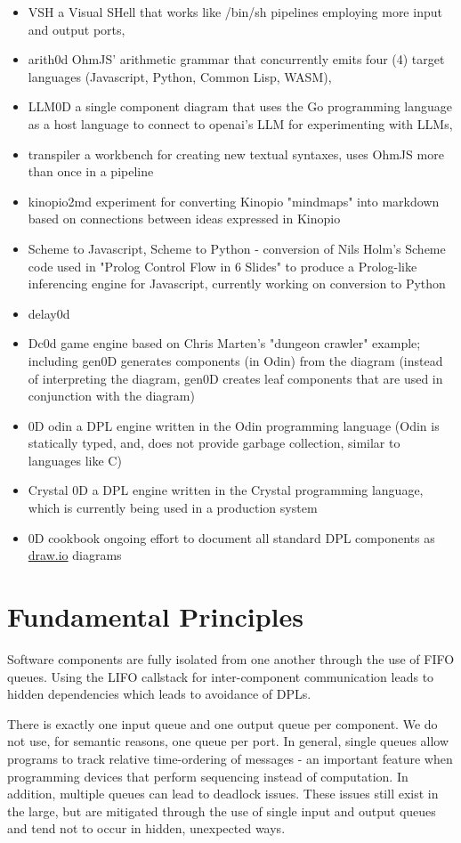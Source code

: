 \documentclass[10pt]{acmart}
\begin{document}
\begin{itemize}
\item VSH a Visual SHell that works like /bin/sh pipelines employing more input and output ports,
\item arith0d OhmJS' arithmetic grammar that concurrently emits four (4) target languages (Javascript, Python, Common Lisp, WASM),
\item LLM0D a single component diagram that uses the Go programming language as a host language to connect to openai's LLM for experimenting with LLMs,
\item transpiler a workbench for creating new textual syntaxes, uses OhmJS more than once in a pipeline
\item kinopio2md experiment for converting Kinopio "mindmaps" into markdown based on connections between ideas expressed in Kinopio
\item Scheme to Javascript, Scheme to Python - conversion of Nils Holm's Scheme code used in "Prolog Control Flow in 6 Slides" to produce a Prolog-like inferencing engine for Javascript, currently working on conversion to Python
\item delay0d
\item Dc0d game engine based on Chris Marten's "dungeon crawler" example\cite{ceptre_paper}; including gen0D generates components (in Odin) from the diagram (instead of interpreting the diagram, gen0D creates leaf components that are used in conjunction with the diagram)
\item 0D odin a DPL engine written in the Odin programming language (Odin is statically typed, and, does not provide garbage collection, similar to languages like C)
\item Crystal 0D a DPL engine written in the Crystal programming language, which is currently being used in a production system
\item 0D cookbook ongoing effort to document all standard DPL components as \href{http://draw.io}{draw.io} diagrams
\end{itemize}

\section{Fundamental Principles}
Software components are fully isolated from one another through the use
of FIFO queues. Using the LIFO callstack for inter-component
communication leads to hidden dependencies which leads to avoidance of
DPLs.

There is exactly one input queue and one output queue per component. We
do not use, for semantic reasons, one queue per port. In general, single
queues allow programs to track relative time-ordering of messages - an
important feature when programming devices that perform sequencing
instead of computation. In addition, multiple queues can lead to
deadlock issues. These issues still exist in the large, but are
mitigated through the use of single input and output queues and tend not
to occur in hidden, unexpected ways.
\end{document}
